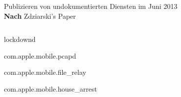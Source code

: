 \begin{frame}
	\centering
	Publizieren von undokumentierten Diensten im Juni 2013\\
	\textbf{Nach} Zdziarski's Paper
	\begin{columns}[T] %
    	\begin{column}[T]{5cm} %
    		\begin{block}{}
				lockdownd
			\end{block}
			\begin{block}{}
				com.apple.mobile.pcapd
			\end{block}
			\begin{block}{}
				com.apple.mobile.file\_relay
			\end{block}
			\begin{block}{}
				com.apple.mobile.house\_arrest
			\end{block}
    	\end{column}
	\end{columns}

\end{frame}